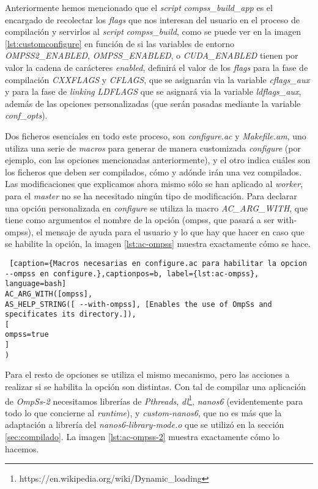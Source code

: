 Anteriormente hemos mencionado que el \textit{script} \textit{compss\_build\_app} es el encargado de recolectar los \textit{flags} que nos interesan del usuario en el proceso de compilación y servirlos al \textit{script} \textit{compss\_build}, como se puede ver en la imagen \ref{lst:customconfigure} en función de si las variables de entorno \textit{OMPSS2\_ENABLED}, \textit{OMPSS\_ENABLED}, o \textit{CUDA\_ENABLED} tienen por valor la cadena de carácteres \textit{enabled}, definirá el valor de los \textit{flags} para la fase de compilación \textit{CXXFLAGS} y \textit{CFLAGS}, que se asignarán via la variable \textit{cflags\_aux} y para la fase de \textit{linking} \textit{LDFLAGS} que se asignará via la variable \textit{ldflags\_aux}, además de las opciones personalizadas (que serán pasadas mediante la variable \textit{conf\_opts}).

\par

Dos ficheros esenciales en todo este proceso, son \textit{configure.ac} y \textit{Makefile.am}, uno utiliza una serie de \textit{macros} para generar de manera customizada \textit{configure} (por ejemplo, con las opciones mencionadas anteriormente), y el otro indica cuáles son los ficheros que deben ser compilados, cómo y adónde irán una vez compilados. Las modificaciones que explicamos ahora mismo sólo se han aplicado al \textit{worker}, para el \textit{master} no se ha necesitado ningún tipo de modificación. Para declarar una opción personalizada en \textit{configure} se utiliza la macro \textit{AC\_ARG\_WITH}, que tiene como argumentos el nombre de la opción (ompss, que pasará a ser with-ompss), el mensaje de ayuda para el usuario y lo que hay que hacer en caso que se habilite la opción, la imagen \ref{lst:ac-ompss} muestra exactamente cómo se hace.

\begin{lstlisting} [caption={Macros necesarias en configure.ac para habilitar la opcion --ompss en configure.},captionpos=b, label={lst:ac-ompss}, language=bash]
AC_ARG_WITH([ompss],
AS_HELP_STRING([ --with-ompss], [Enables the use of OmpSs and 
specificates its directory.]),
[
ompss=true
]
)
\end{lstlisting}

Para el resto de opciones se utiliza el mismo mecanismo, pero las acciones a realizar si se habilita la opción son distintas. Con tal de compilar una aplicación de \textit{OmpSs-2} necesitamos librerías de \textit{Pthreads}, \textit{dl}\footnote{https://en.wikipedia.org/wiki/Dynamic\_loading}, \textit{nanos6} (evidentemente para todo lo que concierne al \textit{runtime}), y \textit{custom-nanos6}, que no es más que la adaptación a librería del \textit{nanos6-library-mode.o} que se utilizó en la sección \ref{sec:compilado}. La imagen \ref{lst:ac-ompss-2} muestra exactamente cómo lo hacemos.

